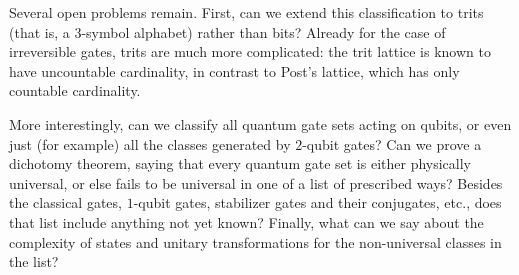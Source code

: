 \documentclass[12pt]{report}
\theoremstyle{plain}
\theoremstyle{definition}
\begin{document}
Several open problems remain. First, can we extend this classification to trits (that is, a $3$-symbol alphabet) rather than bits? Already for the case of irreversible gates, trits are much more complicated: the trit lattice is known to have uncountable cardinality, in contrast to Post's lattice, which has only countable cardinality.

More interestingly, can we classify all quantum gate sets acting on qubits, or even just (for example) all the classes generated by $2$-qubit gates?  Can we prove a dichotomy theorem, saying that every quantum gate set is either physically universal, or else fails to be universal in one of a list of prescribed ways?  Besides the classical gates, $1$-qubit gates, stabilizer gates and their conjugates, etc., does that list include anything not yet known?  Finally, what can we say about the complexity of states and unitary transformations for the non-universal classes in the list?




\end{document}
